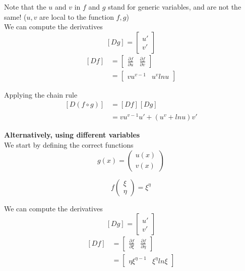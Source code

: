 Note that the $u$ and $v$ in $f$ and $g$ stand for generic variables, and are not the same! ($u,v$ are local to the function $f, g$) \\

We can compute the derivatives 
\[
  \left[ D g \right]_{} = \begin{bmatrix} 
    u' \\ v'  
  \end{bmatrix}
\] 
\begin{align*}
   \left[ D f \right]_{} &= \begin{bmatrix} 
     \frac{\partial f}{\partial u} & \frac{\partial f}{\partial v}  
  \end{bmatrix} \\
                         &= \begin{bmatrix} 
                            v u^{v-1}  & u^v lnu
                         \end{bmatrix}
\end{align*}

Applying the chain rule
\begin{align*}
   \left[ D (f \circ g) \right]_{} &= \left[ D f \right]_{} \left[ D g \right]_{} \\
                                   &= vu^{v-1}u' + (u^v + lnu) v'
\end{align*}

  
\textbf{Alternatively, using different variables} \\
We start by defining the correct functions 
\[
  g(x) = \begin{pmatrix} u(x) \\ v(x) \end{pmatrix} 
\] 

\[
   f \begin{pmatrix} \xi \\ \eta \end{pmatrix}  = \xi^\eta
\] 

We can compute the derivatives 
\[
  \left[ D g \right]_{} = \begin{bmatrix} 
    u' \\ v'  
  \end{bmatrix}
\] 
\begin{align*}
   \left[ D f \right]_{} &= \begin{bmatrix} 
     \frac{\partial f}{\partial \xi} & \frac{\partial f}{\partial \eta}  
  \end{bmatrix} \\
                         &= \begin{bmatrix} 
                            \eta \xi^{\eta-1}  & \xi^\eta ln\xi
                         \end{bmatrix}
\end{align*}

